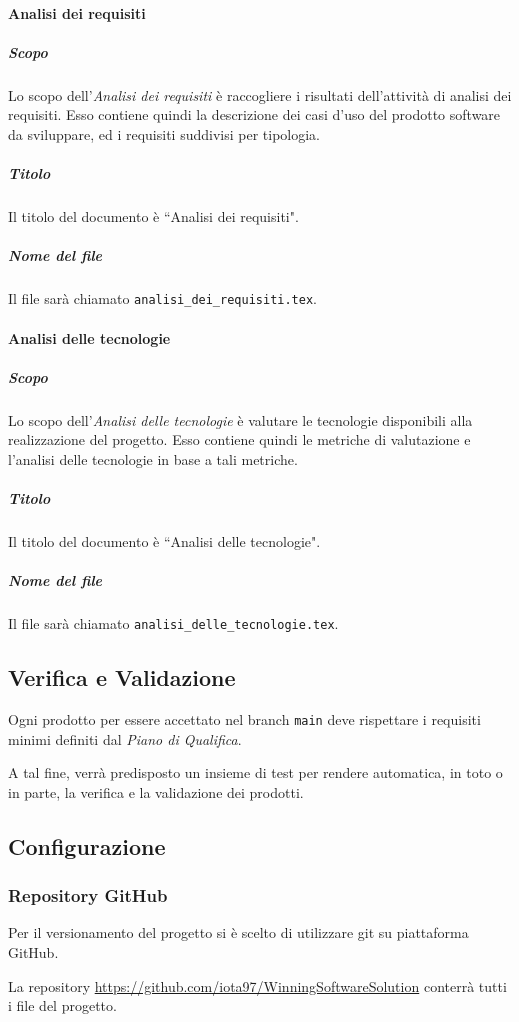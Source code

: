 \documentclass[a4paper, 12pt]{article}
\begin{document}
\paragraph{Analisi dei requisiti}\label{analisi-dei-requisiti}
\subparagraph{Scopo}
Lo scopo dell'\textit{Analisi dei requisiti} è raccogliere i risultati dell’attività di analisi dei requisiti. Esso contiene quindi la descrizione dei casi d’uso del prodotto software da sviluppare, ed i requisiti suddivisi per tipologia.
\subparagraph{Titolo}
Il titolo del documento è ``Analisi dei requisiti".
\subparagraph{Nome del file}
Il file sarà chiamato \texttt{analisi\_dei\_requisiti.tex}.

\paragraph{Analisi delle tecnologie}\label{analisi-delle-tecnologie}
\subparagraph{Scopo}
Lo scopo dell'\textit{Analisi delle tecnologie} è valutare le tecnologie disponibili alla realizzazione del progetto. Esso contiene quindi le metriche di valutazione e l'analisi delle tecnologie in base a tali metriche.
\subparagraph{Titolo}
Il titolo del documento è ``Analisi delle tecnologie".
\subparagraph{Nome del file}
Il file sarà chiamato \texttt{analisi\_delle\_tecnologie.tex}.

\subsection{Verifica e Validazione}\label{verifica-e-validazione}
Ogni prodotto per essere accettato nel branch \texttt{main} deve rispettare i requisiti minimi definiti dal \textit{Piano di Qualifica}. 

A tal fine, verrà predisposto un insieme di test per rendere automatica, in toto o in parte, la verifica e la validazione dei prodotti.

\subsection{Configurazione}

\subsubsection{Repository GitHub}\label{configurazione-github}
Per il versionamento del progetto si è scelto di utilizzare git su piattaforma GitHub.

La repository \url{https://github.com/iota97/WinningSoftwareSolution} conterrà tutti i file del progetto.
\end{document}
